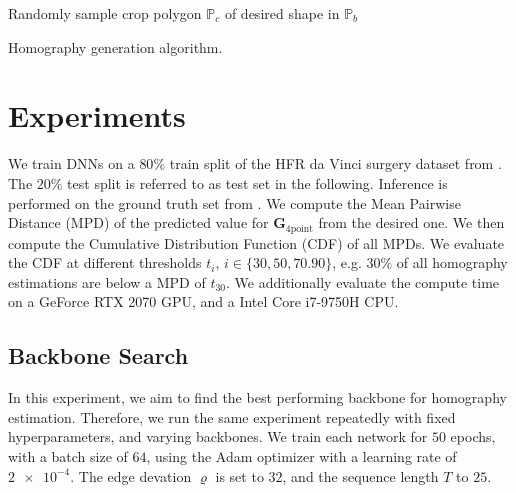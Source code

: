 \begin{algorithm}
    \SetAlgoLined
    Randomly sample crop polygon $\mathbb{P}_c$ of desired shape in $\mathbb{P}_b$\;
    \;
    \caption{Homography generation algorithm.}
    \label{alg::hom}
\end{algorithm}

\section{Experiments}
We train DNNs on a $80\%$ train split of the HFR da Vinci surgery dataset from . The $20\%$ test split is referred to as test set in the following. Inference is performed on the ground truth set from . We compute the Mean Pairwise Distance (MPD) of the predicted value for $\mathbf{G}_{4\text{point}}$ from the desired one. We then compute the Cumulative Distribution Function (CDF) of all MPDs. We evaluate the CDF at different thresholds $t_i,\,i\in\{30,50,70.90\}$, e.g. $30\%$ of all homography estimations are below a MPD of $t_{30}$. We additionally evaluate the compute time on a GeForce RTX 2070 GPU, and a Intel Core i7-9750H CPU.

\subsection{Backbone Search}
In this experiment, we aim to find the best performing backbone for homography estimation. Therefore, we run the same experiment repeatedly with fixed hyperparameters, and varying backbones. We train each network for $50$ epochs, with a batch size of $64$, using the Adam optimizer with a learning rate of $\num{2e-4}$. The edge devation $\varrho$ is set to $32$, and the sequence length $T$ to $25$.

